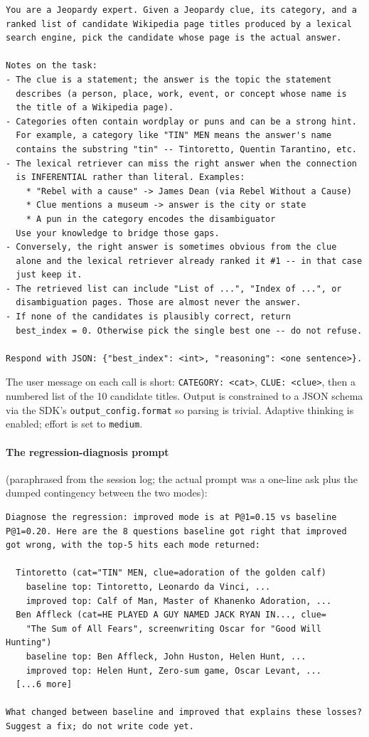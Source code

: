 \documentclass[11pt]{article}
\begin{document}
\begin{lstlisting}
You are a Jeopardy expert. Given a Jeopardy clue, its category, and a
ranked list of candidate Wikipedia page titles produced by a lexical
search engine, pick the candidate whose page is the actual answer.

Notes on the task:
- The clue is a statement; the answer is the topic the statement
  describes (a person, place, work, event, or concept whose name is
  the title of a Wikipedia page).
- Categories often contain wordplay or puns and can be a strong hint.
  For example, a category like "TIN" MEN means the answer's name
  contains the substring "tin" -- Tintoretto, Quentin Tarantino, etc.
- The lexical retriever can miss the right answer when the connection
  is INFERENTIAL rather than literal. Examples:
    * "Rebel with a cause" -> James Dean (via Rebel Without a Cause)
    * Clue mentions a museum -> answer is the city or state
    * A pun in the category encodes the disambiguator
  Use your knowledge to bridge those gaps.
- Conversely, the right answer is sometimes obvious from the clue
  alone and the lexical retriever already ranked it #1 -- in that case
  just keep it.
- The retrieved list can include "List of ...", "Index of ...", or
  disambiguation pages. Those are almost never the answer.
- If none of the candidates is plausibly correct, return
  best_index = 0. Otherwise pick the single best one -- do not refuse.

Respond with JSON: {"best_index": <int>, "reasoning": <one sentence>}.
\end{lstlisting}

The user message on each call is short:
\texttt{CATEGORY: <cat>}, \texttt{CLUE: <clue>}, then a numbered list
of the 10 candidate titles. Output is constrained to a JSON schema
via the SDK's \texttt{output\_config.format} so parsing is trivial.
Adaptive thinking is enabled; effort is set to \texttt{medium}.

\paragraph{The regression-diagnosis prompt} (paraphrased from the
session log; the actual prompt was a one-line ask plus the dumped
contingency between the two modes):

\begin{lstlisting}
Diagnose the regression: improved mode is at P@1=0.15 vs baseline
P@1=0.20. Here are the 8 questions baseline got right that improved
got wrong, with the top-5 hits each mode returned:

  Tintoretto (cat="TIN" MEN, clue=adoration of the golden calf)
    baseline top: Tintoretto, Leonardo da Vinci, ...
    improved top: Calf of Man, Master of Khanenko Adoration, ...
  Ben Affleck (cat=HE PLAYED A GUY NAMED JACK RYAN IN..., clue=
    "The Sum of All Fears", screenwriting Oscar for "Good Will Hunting")
    baseline top: Ben Affleck, John Huston, Helen Hunt, ...
    improved top: Helen Hunt, Zero-sum game, Oscar Levant, ...
  [...6 more]

What changed between baseline and improved that explains these losses?
Suggest a fix; do not write code yet.
\end{lstlisting}
\end{document}
